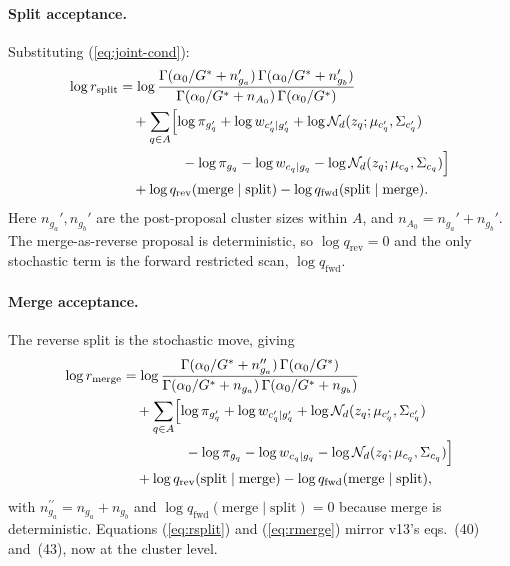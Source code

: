 \documentclass[11pt]{article}
\begin{document}
\paragraph{Split acceptance.} Substituting (\ref{eq:joint-cond}):
\begin{equation}
\begin{aligned}
\log r_{\mathrm{split}}
 &= \log\frac{\Gamma(\alpha_0/G^*+n_{g_a}^{\prime})\,\Gamma(\alpha_0/G^*+n_{g_b}^{\prime})}
              {\Gamma(\alpha_0/G^*+n_{A_0})\,\Gamma(\alpha_0/G^*)}\\
 &\quad + \sum_{q\in A}\Bigl[
    \log\pi_{g'_q}+\log w_{c'_q|g'_q}+\log\mathcal{N}_d(z_q;\mu_{c'_q},\Sigma_{c'_q})\\
 &\hspace{45pt}-\log\pi_{g_q}-\log w_{c_q|g_q}-\log\mathcal{N}_d(z_q;\mu_{c_q},\Sigma_{c_q})\Bigr]\\
 &\quad +\log q_{\mathrm{rev}}(\text{merge}\mid\text{split})
        -\log q_{\mathrm{fwd}}(\text{split}\mid\text{merge}).
\end{aligned}
\label{eq:rsplit}
\end{equation}
Here $n_{g_a}',n_{g_b}'$ are the post-proposal cluster sizes within $A$,
and $n_{A_0}=n_{g_a}'+n_{g_b}'$.
The merge-as-reverse proposal is deterministic, so
$\log q_{\mathrm{rev}}=0$ and the only stochastic term is the forward
restricted scan, $\log q_{\mathrm{fwd}}$.

\paragraph{Merge acceptance.} The reverse split is the stochastic move,
giving
\begin{equation}
\begin{aligned}
\log r_{\mathrm{merge}}
 &= \log\frac{\Gamma(\alpha_0/G^*+n_{g_a}^{\prime\prime})\,\Gamma(\alpha_0/G^*)}
              {\Gamma(\alpha_0/G^*+n_{g_a})\,\Gamma(\alpha_0/G^*+n_{g_b})}\\
 &\quad + \sum_{q\in A}\Bigl[\log\pi_{g'_q}+\log w_{c'_q|g'_q}+\log\mathcal{N}_d(z_q;\mu_{c'_q},\Sigma_{c'_q})\\
 &\hspace{45pt}-\log\pi_{g_q}-\log w_{c_q|g_q}-\log\mathcal{N}_d(z_q;\mu_{c_q},\Sigma_{c_q})\Bigr]\\
 &\quad +\log q_{\mathrm{rev}}(\text{split}\mid\text{merge})
        -\log q_{\mathrm{fwd}}(\text{merge}\mid\text{split}),
\end{aligned}
\label{eq:rmerge}
\end{equation}
with $n_{g_a}^{\prime\prime}=n_{g_a}+n_{g_b}$ and
$\log q_{\mathrm{fwd}}(\text{merge}\mid\text{split})=0$ because merge is
deterministic. Equations (\ref{eq:rsplit}) and (\ref{eq:rmerge}) mirror
v13's eqs.~(40) and~(43), now at the cluster level.
\end{document}
